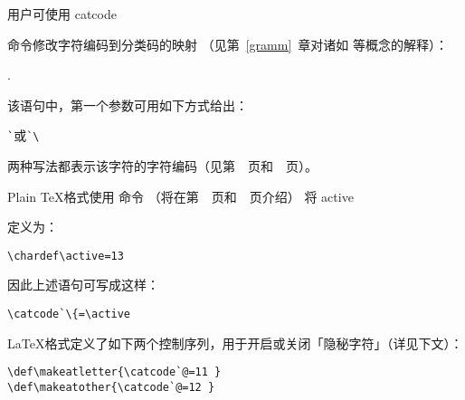 \documentclass{book}
\begin{document}
用户可使用 \csterm catcode\par 命令修改字符编码到分类码的映射%
（见第~\ref{gramm}~章对诸如  等概念的解释）：
\begin{disp}.\end{disp}
该语句中，第一个参数可用如下方式给出：
\begin{disp}\verb>`>\quad 或\quad \verb>`\>\end{disp}
两种写法都表示该字符的字符编码（见第~\pageref{char:code}~页和~\pageref{int:denotation}~页）。

Plain \TeX 格式使用  命令%
（将在第~\pageref{chardef}~页和~\pageref{num:chardef}~页介绍）%
将 \csterm active\par 定义为：
\begin{verbatim}
\chardef\active=13
\end{verbatim}
因此上述语句可写成这样：
\begin{verbatim}
\catcode`\{=\active
\end{verbatim}

\LaTeX 格式定义了如下两个控制序列，用于开启或关闭「隐秘字符」（详见下文）：
\begin{verbatim}
\def\makeatletter{\catcode`@=11 }
\def\makeatother{\catcode`@=12 }
\end{verbatim}
\end{document}
